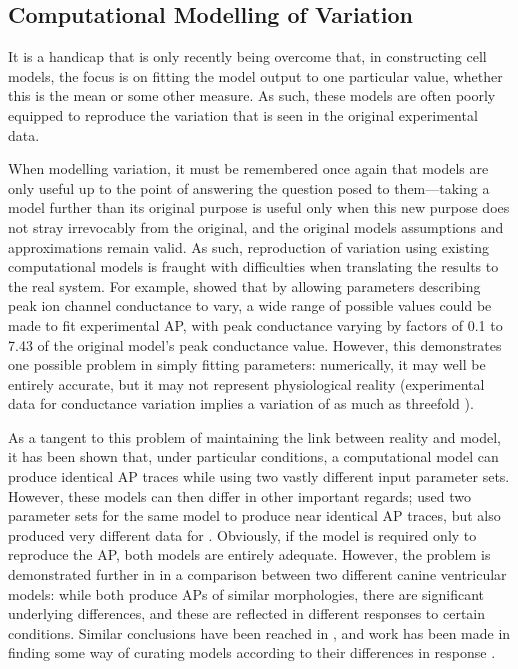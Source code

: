 \documentclass[../thesis-main.tex]{subfiles}
\begin{document}
 \subsection{Computational Modelling of Variation}
 \label{subsec:comp-var}
 It is a handicap that is only recently being overcome that, in constructing cell models, the focus is on fitting the model output to one particular value, whether this is the mean or some other measure. As such, these models are often poorly equipped to reproduce the variation that is seen in the original experimental data.
 
 When modelling variation, it must be remembered once again that models are only useful up to the point of answering the question posed to them---taking a model further than its original purpose is useful only when this new purpose does not stray irrevocably from the original, and the original models assumptions and approximations remain valid. As such, reproduction of variation using existing computational models is fraught with difficulties when translating the results to the real system. For example,  \citet{Davies2012} showed that by allowing parameters describing peak ion channel conductance to vary, a wide range of possible values could be made to fit experimental AP, with peak conductance varying by factors of 0.1 to 7.43 of the original model's peak conductance value. However, this demonstrates one possible problem in simply fitting parameters: numerically, it may well be entirely accurate, but it may not represent physiological reality (experimental data for conductance variation implies a variation of as much as threefold \citep{Schulz2006}).
 
 As a tangent to this problem of maintaining the link between reality and model, it has been shown that, under particular conditions, a computational model can produce identical AP traces while using two vastly different input parameter sets. However, these models can then differ in other important regards; \citet{Sarkar2010} used two parameter sets for the same model to produce near identical AP traces, but also produced very different data for \cai{}. Obviously, if the model is required only to reproduce the AP, both models are entirely adequate. However, the problem is demonstrated further in \citet{Cherry2007} in a comparison between two different canine ventricular models: while both produce APs of similar morphologies, there are significant underlying differences, and these are reflected in different responses to certain conditions. Similar conclusions have been reached in \citet{Romero2011}, and work has been made in finding some way of curating models according to their differences in response \citep{Terkildsen2008, Cooper2011}.
 
\end{document}
